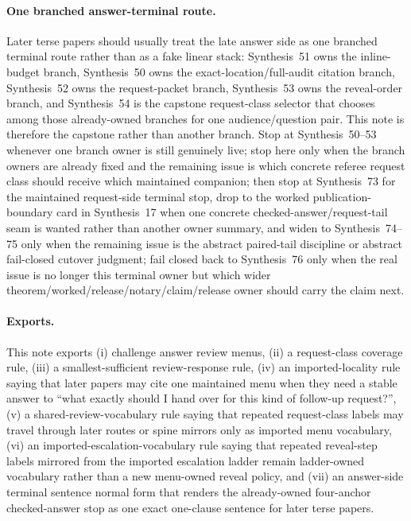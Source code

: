 \documentclass[11pt]{article}
\begin{document}
\paragraph{One branched answer-terminal route.}
Later terse papers should usually treat the late answer side as one branched terminal route rather than as a fake linear stack: Synthesis~51 owns the inline-budget branch, Synthesis~50 owns the exact-location/full-audit citation branch, Synthesis~52 owns the request-packet branch, Synthesis~53 owns the reveal-order branch, and Synthesis~54 is the capstone request-class selector that chooses among those already-owned branches for one audience/question pair. This note is therefore the capstone rather than another branch. Stop at Synthesis~50--53 whenever one branch owner is still genuinely live; stop here only when the branch owners are already fixed and the remaining issue is which concrete referee request class should receive which maintained companion; then stop at Synthesis~73 for the maintained request-side terminal stop, drop to the worked publication-boundary card in Synthesis~17 when one concrete checked-answer/request-tail seam is wanted rather than another owner summary, and widen to Synthesis~74--75 only when the remaining issue is the abstract paired-tail discipline or abstract fail-closed cutover judgment; fail closed back to Synthesis~76 only when the real issue is no longer this terminal owner but which wider theorem/worked/release/notary/claim/release owner should carry the claim next.

\paragraph{Exports.}
This note exports (i) challenge answer review menus, (ii) a request-class coverage rule, (iii) a smallest-sufficient review-response rule, (iv) an imported-locality rule saying that later papers may cite one maintained menu when they need a stable answer to ``what exactly should I hand over for this kind of follow-up request?'', (v) a shared-review-vocabulary rule saying that repeated request-class labels may travel through later routes or spine mirrors only as imported menu vocabulary, (vi) an imported-escalation-vocabulary rule saying that repeated reveal-step labels mirrored from the imported escalation ladder remain ladder-owned vocabulary rather than a new menu-owned reveal policy, and (vii) an answer-side terminal sentence normal form that renders the already-owned four-anchor checked-answer stop as one exact one-clause sentence for later terse papers.
\end{document}
